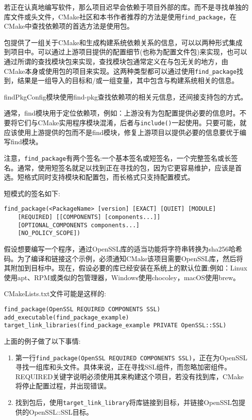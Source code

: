 
若正在认真地编写软件，那么项目迟早会依赖于项目外部的库。而不是寻找单独的库文件或头文件，CMake社区和本书作者推荐的方法是使用\texttt{find\_package}，在CMake中查找依赖项的首选方法是使用包。

包提供了一组关于CMake和生成构建系统依赖关系的信息，可以以两种形式集成到项目中。可以通过上游项目提供的配置细节(也称为配置文件包)来实现，也可以通过所谓的查找模块包来实现，查找模块包通常定义在与包无关的地方，由CMake本身或使用包的项目来实现。这两种类型都可以通过使用\texttt{find\_package}找到，结果是一组导入的目标和/或一组变量，其中包含与构建系统相关的信息。

findPkgConfig模块使用find-pkg查找依赖项的相关元信息，还间接支持包的方式。

通常，find模块用于定位依赖项，例如：上游没有为包配置提供必要的信息时。不要将它们与CMake实用程序模块混淆，后者与\texttt{include()}一起使用。只要可能，就应该使用上游提供的包而不是find模块，修复上游项目以提供必要的信息要优于编写find模块。

注意，\texttt{find\_package}有两个签名:一个基本签名或短签名，一个完整签名或长签名。通常，使用短签名就足以找到正在寻找的包，因为它更容易维护，应该是首选。短格式同时支持模块和配置包，而长格式只支持配置模式。

短模式的签名如下:

\begin{lstlisting}[style=styleCMake]
find_package(<PackageName> [version] [EXACT] [QUIET] [MODULE]
	[REQUIRED] [[COMPONENTS] [components...]]
	[OPTIONAL_COMPONENTS components...]
	[NO_POLICY_SCOPE])
\end{lstlisting}

假设想要编写一个程序，通过OpenSSL库的适当功能将字符串转换为sha256哈希码。为了编译和链接这个示例，必须通知CMake该项目需要OpenSSL库，然后将其附加到目标中。现在，假设必要的库已经安装在系统上的默认位置;例如：Linux使用apt、RPM或类似的包管理器，Windows使用chocoley，macOS使用brew。

CMakeLists.txt文件可能是这样的:

\begin{lstlisting}[style=styleCMake]
find_package(OpenSSL REQUIRED COMPONENTS SSL)
add_executable(find_package_example)
target_link_libraries(find_package_example PRIVATE OpenSSL::SSL)
\end{lstlisting}

上面的例子做了以下事情:

\begin{enumerate}
\item 
第一行\texttt{find\_package(OpenSSL REQUIRED COMPONENTS SSL)}，正在为OpenSSL寻找一组库和头文件。具体来说，正在寻找SSL组件，而忽略加密组件。REQUIRED关键字说明必须使用其来构建这个项目，若没有找到库，CMake将停止配置过程，并出现错误。

\item 
找到包后，使用\texttt{target\_link\_library}将库链接到目标，并链接OpenSSL包提供的OpenSSL::SSL目标。
\end{enumerate}

